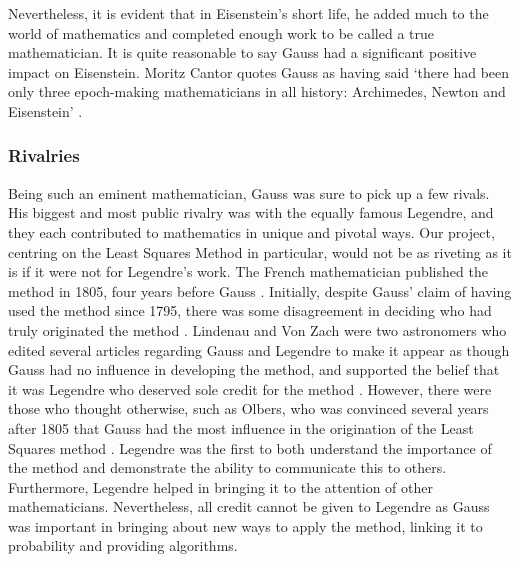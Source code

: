 \documentclass{article}
\begin{document}
Nevertheless, it is evident that in Eisenstein’s short life, he added much to the world of mathematics and completed enough work to be called a true mathematician. It is quite reasonable to say Gauss had a significant positive impact on Eisenstein. Moritz Cantor quotes Gauss as having said ‘there had been only three epoch-making mathematicians in all history: Archimedes, Newton and Eisenstein’ \cite{titan}. 

\subsubsection{Rivalries}

Being such an eminent mathematician, Gauss was sure to pick up a few rivals. His biggest and most public rivalry was with the equally famous Legendre, and they each contributed to mathematics in unique and pivotal ways. Our project, centring on the Least Squares Method in particular, would not be as riveting as it is if it were not for Legendre’s work. The French mathematician published the method in 1805, four years before Gauss \cite{stigler}. Initially, despite Gauss’ claim of having used the method since 1795, there was some disagreement in deciding who had truly originated the method \cite{stigler}. Lindenau and Von Zach were two astronomers who edited several articles regarding Gauss and Legendre to make it appear as though Gauss had no influence in developing the method, and supported the belief that it was Legendre who deserved sole credit for the method \cite{stigler}. However, there were those who thought otherwise, such as Olbers, who was convinced several years after 1805 that Gauss had the most influence in the origination of the Least Squares method \cite{stigler}. Legendre was the first to both understand the importance of the method and demonstrate the ability to communicate this to others. Furthermore, Legendre helped in bringing it to the attention of other mathematicians. Nevertheless, all credit cannot be given to Legendre as Gauss was important in bringing about new ways to apply the method, linking it to probability and providing algorithms. 
\end{document}

